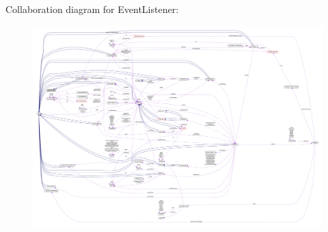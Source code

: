 Collaboration diagram for Event\+Listener\+:
\nopagebreak
\begin{figure}[H]
\begin{center}
\leavevmode
\includegraphics[width=350pt]{classEventListener__coll__graph}
\end{center}
\end{figure}
